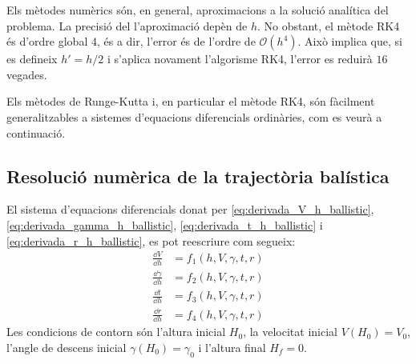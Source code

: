 Els mètodes numèrics són, en general, aproximacions a la solució analítica del problema. La precisió del l'aproximació depèn de $h$. No obstant, el mètode RK4 és d'ordre global 4, és a dir, l'error és de l'ordre de $\mathcal{O}(h^4)$. Això implica que, si es defineix $h' = h / 2$ i s'aplica novament l'algorisme RK4, l'error es reduirà $16$ vegades.

Els mètodes de Runge-Kutta i, en particular el mètode RK4, són fàcilment generalitzables a sistemes d'equacions diferencials ordinàries, com es veurà a continuació.

\subsection{Resolució numèrica de la trajectòria balística}

El sistema d'equacions diferencials donat per \eqref{eq:derivada_V_h_ballistic}, \eqref{eq:derivada_gamma_h_ballistic}, \eqref{eq:derivada_t_h_ballistic} i \eqref{eq:derivada_r_h_ballistic}, es pot reescriure com segueix:
\begin{align}
    \frac{\dd V}{\dd h} &= f_1 \left( h, V, \gamma, t, r \right)        \\
    \frac{\dd \gamma}{\dd h} &= f_2 \left( h, V, \gamma, t, r \right)   \\
    \frac{\dd t}{\dd h} &= f_3 \left( h, V, \gamma, t, r \right)        \\
    \frac{\dd r}{\dd h} &= f_4 \left( h, V, \gamma, t, r \right)
\end{align}
Les condicions de contorn són l'altura inicial $H_0$, la velocitat inicial $V(H_0) = V_0$, l'angle de descens inicial $\gamma(H_0) = \gamma_0$ i l'altura final $H_f = 0$.

